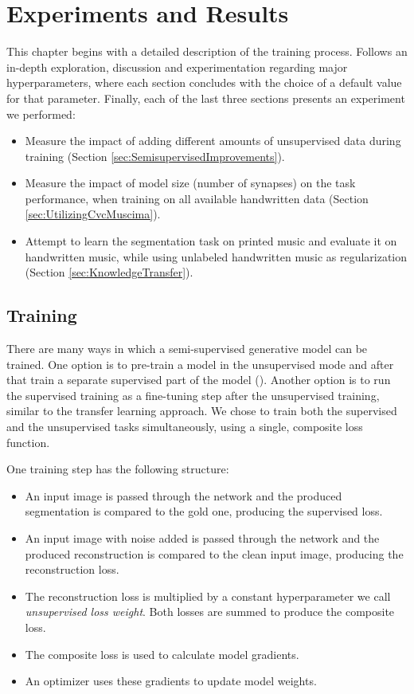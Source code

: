 \chapter{Experiments and Results}
\label{chap:ExperimentsAndResults}

This chapter begins with a detailed description of the training process. Follows an in-depth exploration, discussion and experimentation regarding major hyperparameters, where each section concludes with the choice of a default value for that parameter. Finally, each of the last three sections presents an experiment we performed:

\begin{itemize}
    \item Measure the impact of adding different amounts of unsupervised data during training (Section \ref{sec:SemisupervisedImprovements}).
    \item Measure the impact of model size (number of synapses) on the task performance, when training on all available handwritten data (Section \ref{sec:UtilizingCvcMuscima}).
    \item Attempt to learn the segmentation task on printed music and evaluate it on handwritten music, while using unlabeled handwritten music as regularization (Section \ref{sec:KnowledgeTransfer}).
\end{itemize}


\section{Training}
\label{sec:Training}

There are many ways in which a semi-supervised generative model can be trained. One option is to pre-train a model in the unsupervised mode and after that train a separate supervised part of the model (\cite{KingmaSslVae}). Another option is to run the supervised training as a fine-tuning step after the unsupervised training, similar to the transfer learning approach. We chose to train both the supervised and the unsupervised tasks simultaneously, using a single, composite loss function.

One training step has the following structure:

\begin{itemize}
    \item An input image is passed through the network and the produced segmentation is compared to the gold one, producing the supervised loss.
    \item An input image with noise added is passed through the network and the produced reconstruction is compared to the clean input image, producing the reconstruction loss.
    \item The reconstruction loss is multiplied by a constant hyperparameter we call \emph{unsupervised loss weight}. Both losses are summed to produce the composite loss.
    \item The composite loss is used to calculate model gradients.
    \item An optimizer uses these gradients to update model weights.
\end{itemize}

